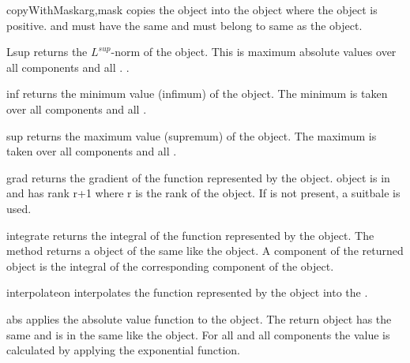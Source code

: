 \begin{methoddesc}[Data]{copyWithMask}{arg,mask}
copies the \Data object  into the object 
where the \Data object  is positive. 
and  must have the same \Shape 
and must belong to same \FunctionSpace as
the object.
\end{methoddesc}

\begin{methoddesc}[Data]{Lsup}{}
returns the $L^{sup}$-norm of the object. This is maximum absolute values over all components and all \DataSamplePoints. .
\end{methoddesc}
\begin{methoddesc}[Data]{inf}{}
returns the minimum value (infimum) of the object. The minimum is
taken over all components and all \DataSamplePoints .  
\end{methoddesc}

\begin{methoddesc}[Data]{sup}{}
returns the maximum value (supremum) of the object. The maximum is
taken over all components and all \DataSamplePoints .  
\end{methoddesc}

\begin{methoddesc}[Data]{grad}{}
returns the gradient of the function represented by the object.
\Data object is in \FunctionSpace {} and has rank r+1 where r is the rank of the object.
If  is not present, a suitbale \FunctionSpace is used. 
\end{methoddesc}

\begin{methoddesc}[Data]{integrate}{}
returns the integral of the function represented by the object. The method returns
a  object of the same \Shape like the object.  A
component of the returned object is the integral of the corresponding
component of the object. 
\end{methoddesc}

\begin{methoddesc}[Data]{interpolate}{on}
interpolates 
the function represented by the object
into the \FunctionSpace{}.
\end{methoddesc}

\begin{methoddesc}[Data]{abs}{} 
applies the absolute value function to the object. The
return \Data object has the same \Shape and is in the same
\FunctionSpace like the object. For all \DataSamplePoints and all
components the value is calculated by applying the exponential
function. 
\end{methoddesc}

